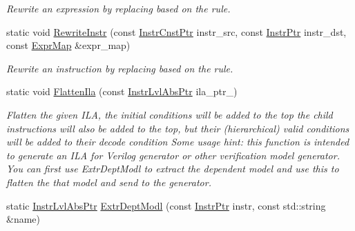 \begin{DoxyCompactItemize}
\begin{DoxyCompactList}\small\item\em Rewrite an expression by replacing based on the rule. \end{DoxyCompactList}\item 
\mbox{\label{classilang_1_1_abs_knob_aff155ca74f7cecc47b02c54c8e5c5a49}} 
static void \mbox{\hyperlink{classilang_1_1_abs_knob_aff155ca74f7cecc47b02c54c8e5c5a49}{Rewrite\+Instr}} (const \mbox{\hyperlink{namespaceilang_a13249a9b1d22eb3454730a7903be4364}{Instr\+Cnst\+Ptr}} instr\+\_\+src, const \mbox{\hyperlink{namespaceilang_af88a19312ae653d687a0d1207bb284f6}{Instr\+Ptr}} instr\+\_\+dst, const \mbox{\hyperlink{namespaceilang_ad40e6475e04844bcad9c380aac0b215c}{Expr\+Map}} \&expr\+\_\+map)
\begin{DoxyCompactList}\small\item\em Rewrite an instruction by replacing based on the rule. \end{DoxyCompactList}\item 
\mbox{\label{classilang_1_1_abs_knob_ae0d72daf9c00d1ffa0a121022e4e8840}} 
static void \mbox{\hyperlink{classilang_1_1_abs_knob_ae0d72daf9c00d1ffa0a121022e4e8840}{Flatten\+Ila}} (const \mbox{\hyperlink{namespaceilang_ad1b30fdf347e493b3937143da05d1a72}{Instr\+Lvl\+Abs\+Ptr}} ila\+\_\+ptr\+\_\+)
\begin{DoxyCompactList}\small\item\em Flatten the given I\+LA, the initial conditions will be added to the top the child instructions will also be added to the top, but their (hierarchical) valid conditions will be added to their decode condition Some usage hint\+: this function is intended to generate an I\+LA for Verilog generator or other verification model generator. You can first use Extr\+Dept\+Modl to extract the dependent model and use this to flatten the that model and send to the generator. \end{DoxyCompactList}\item 
\mbox{\label{classilang_1_1_abs_knob_a58b7509a2ccf2c515d3cdf5dab95888f}} 
static \mbox{\hyperlink{namespaceilang_ad1b30fdf347e493b3937143da05d1a72}{Instr\+Lvl\+Abs\+Ptr}} \mbox{\hyperlink{classilang_1_1_abs_knob_a58b7509a2ccf2c515d3cdf5dab95888f}{Extr\+Dept\+Modl}} (const \mbox{\hyperlink{namespaceilang_af88a19312ae653d687a0d1207bb284f6}{Instr\+Ptr}} instr, const std\+::string \&name)

\end{DoxyCompactItemize}
